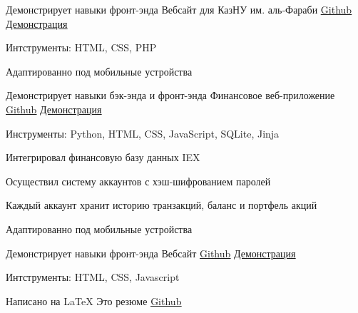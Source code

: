 

\begin{cventries}

 \cventry
    {Демонстрирует навыки фронт-энда} %
    {Вебсайт для КазНУ им. аль‑Фараби} %
    {\small\underline{\href{https://github.com/timurmerkuriev/Website-for-KazNU}{Github}}} %
    {\footnotesize\underline{\href{https://timurmerkuriev.github.io/Website-for-KazNU/}{Демонстрация}}} %
    {
      \begin{cvitems} %
        \item {Интструменты: HTML, CSS, PHP}
        \item {Адаптированно под мобильные устройства}
      \end{cvitems}
    }


  

  \cventry
    {Демонстрирует навыки бэк-энда и фронт-энда} %
    {Финансовое веб-приложение} %
    {\small\underline{\href{https://github.com/timurmerkuriev/finance}{Github}}} %
    {\footnotesize\underline{\href{https://youtu.be/h15x9UTzdnI}{Демонстрация}}}  %
    {
      \begin{cvitems} %
        \item {Инструменты: Python, HTML, CSS, JavaScript, SQLite, Jinja}
        \item {Интегрировал финансовую базу данных IEX}
        \item {Осуществил систему аккаунтов с хэш-шифрованием паролей}
        \item {Каждый аккаунт хранит историю транзакций, баланс и портфель акций}
        \item {Адаптированно под мобильные устройства}
      \end{cvitems}
    }

    \cventry
    {Демонстрирует навыки фронт-энда} %
    {Вебсайт} %
    {\small\underline{\href{https://github.com/timurmerkuriev/homepage}{Github}}} %
    {\footnotesize\underline{\href{https://timurmerkuriev.github.io/homepage}{Демонстрация}}} %
    {
      \begin{cvitems} %
        \item {Интструменты: HTML, CSS, Javascript}
      \end{cvitems}
    }

\cventry
    {Написано на LaTeX} %
    {Это резюме} %
    {\small\underline{\href{https://github.com/timurmerkuriev/latex-cv}{Github}}} %
    {} %
    {}
\end{cventries}

